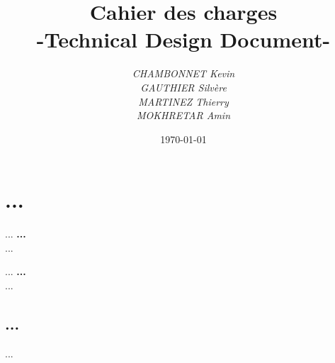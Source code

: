 \documentclass[a4paper]{article}
\title{Cahier des charges\\-Technical Design Document-}
\author{\emph{CHAMBONNET Kevin}\\\emph{GAUTHIER Silvère}\\\emph{MARTINEZ Thierry}\\\emph{MOKHRETAR Amin}}
\date{\today}
\begin{document}
\maketitle

\section*{...}

...    \textbf{ ... }\\...
\bigskip

...    \textbf{ ... }\\...

\subsection*{...}
...
\end{document}
